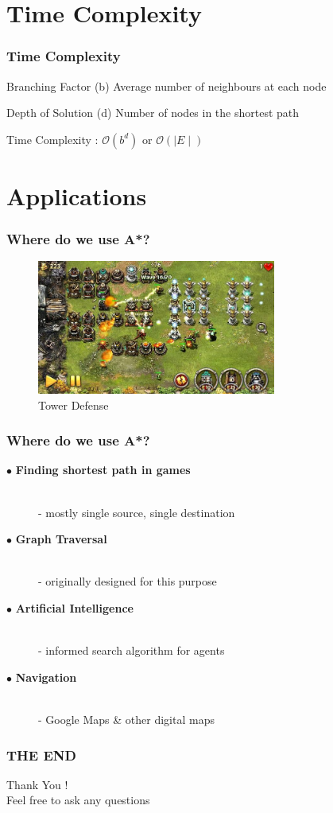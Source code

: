\documentclass[14pt]{beamer}
\begin{document}
\section{Time Complexity}
\begin{frame}
	\frametitle{Time Complexity}
	\begin{block}{Branching Factor (b)}
		Average number of neighbours at each node
	\end{block}
	\hfill
	\pause
	\begin{block}{Depth of Solution (d)}
		Number of nodes in the shortest path
	\end{block}
	\hfill
	\pause
	\begin{tcolorbox}[width=\textwidth, height=0.2\textheight]
		\large
		Time Complexity : $\mathcal{O}(b^d)$ or $\mathcal{O}(\mid E\mid)$
	\end{tcolorbox}
\end{frame}

\section{Applications}
\begin{frame}
	\frametitle{Where do we use A*?}
	\begin{figure}
		\centering
		\includegraphics[width=0.7\textwidth]{towerdefense}
		\caption{Tower Defense}
	\end{figure}
\end{frame}

\begin{frame}
	\frametitle{Where do we use A*?}
	\begin{description}
		\item[$\bullet$ \bfseries{Finding shortest path in games}] \hfill \\ - mostly single source, single destination
		\pause
		\item[$\bullet$ \bfseries{Graph Traversal}] \hfill \\ - originally designed for this purpose 
		\pause
		\item[$\bullet$ \bfseries{Artificial Intelligence}] \hfill \\ - informed search algorithm for agents 
		\pause
		\item[$\bullet$ \bfseries{Navigation}] \hfill \\ - Google Maps \& other digital maps
	\end{description}
\end{frame}


\begin{frame}
	\frametitle{THE END}
	\centering
	\LARGE
	Thank You ! \\
	\Large
	Feel free to ask any questions
\end{frame}
\end{document}
